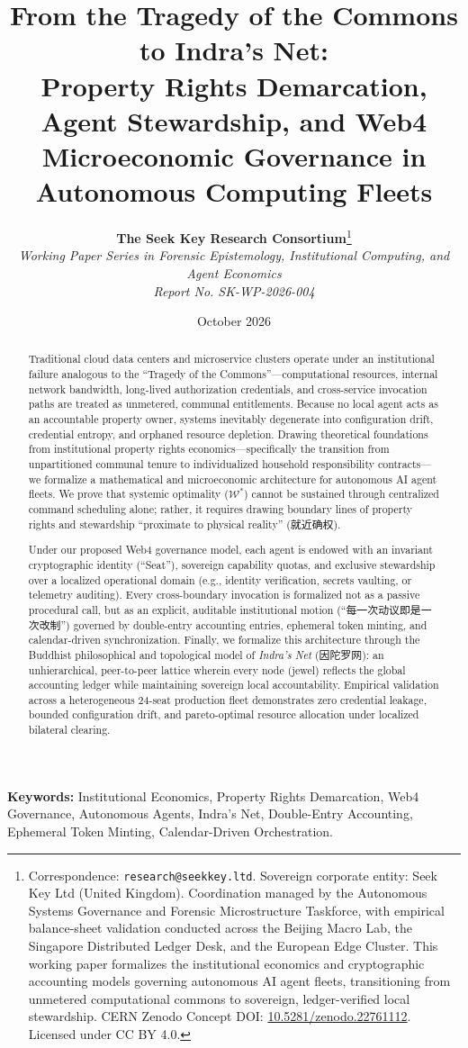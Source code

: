 \documentclass[11pt,a4paper]{article}
\title{\textbf{From the Tragedy of the Commons to Indra's Net: \\ \Large Property Rights Demarcation, Agent Stewardship, and Web4 Microeconomic Governance in Autonomous Computing Fleets}}
\author{
    \textbf{The Seek Key Research Consortium}\thanks{Correspondence: \texttt{research@seekkey.ltd}. Sovereign corporate entity: Seek Key Ltd (United Kingdom). Coordination managed by the Autonomous Systems Governance and Forensic Microstructure Taskforce, with empirical balance-sheet validation conducted across the Beijing Macro Lab, the Singapore Distributed Ledger Desk, and the European Edge Cluster. This working paper formalizes the institutional economics and cryptographic accounting models governing autonomous AI agent fleets, transitioning from unmetered computational commons to sovereign, ledger-verified local stewardship. CERN Zenodo Concept DOI: \href{https://doi.org/10.5281/zenodo.22761112}{10.5281/zenodo.22761112}. Licensed under CC BY 4.0.} \\
    \textit{Working Paper Series in Forensic Epistemology, Institutional Computing, and Agent Economics} \\
    \textit{Report No. SK-WP-2026-004}
}
\date{October 2026}
\begin{document}
\maketitle

\begin{abstract}
Traditional cloud data centers and microservice clusters operate under an institutional failure analogous to the ``Tragedy of the Commons''—computational resources, internal network bandwidth, long-lived authorization credentials, and cross-service invocation paths are treated as unmetered, communal entitlements. Because no local agent acts as an accountable property owner, systems inevitably degenerate into configuration drift, credential entropy, and orphaned resource depletion. Drawing theoretical foundations from institutional property rights economics—specifically the transition from unpartitioned communal tenure to individualized household responsibility contracts—we formalize a mathematical and microeconomic architecture for autonomous AI agent fleets. We prove that systemic optimality ($\mathcal{W}^*$) cannot be sustained through centralized command scheduling alone; rather, it requires drawing boundary lines of property rights and stewardship ``proximate to physical reality'' (就近确权). 

Under our proposed Web4 governance model, each agent is endowed with an invariant cryptographic identity (``Seat''), sovereign capability quotas, and exclusive stewardship over a localized operational domain (e.g., identity verification, secrets vaulting, or telemetry auditing). Every cross-boundary invocation is formalized not as a passive procedural call, but as an explicit, auditable institutional motion (``每一次动议即是一次改制'') governed by double-entry accounting entries, ephemeral token minting, and calendar-driven synchronization. Finally, we formalize this architecture through the Buddhist philosophical and topological model of \textit{Indra's Net} (因陀罗网): an unhierarchical, peer-to-peer lattice wherein every node (jewel) reflects the global accounting ledger while maintaining sovereign local accountability. Empirical validation across a heterogeneous 24-seat production fleet demonstrates zero credential leakage, bounded configuration drift, and pareto-optimal resource allocation under localized bilateral clearing.
\end{abstract}

\vspace{0.5em}
\noindent \textbf{Keywords:} Institutional Economics, Property Rights Demarcation, Web4 Governance, Autonomous Agents, Indra's Net, Double-Entry Accounting, Ephemeral Token Minting, Calendar-Driven Orchestration.
\end{document}
